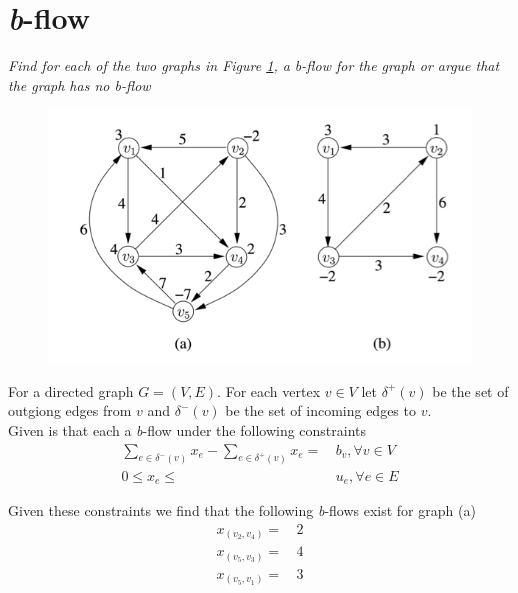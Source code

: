 \section{\textit{b}-flow}
\textit{Find for each of the two graphs in Figure \ref{fig:bflow}, a b-flow for the graph or argue that the graph has no b-flow}
\begin{figure}[h]
  \centering
  \includegraphics[scale=0.4]{images/bflow_graphs.png}
  \label{fig:bflow}
\end{figure}

For a directed graph \(G=(V,E)\). For each vertex \(v \in V\) let \(\delta^+(v)\) be the set of outgiong edges from \(v\) and \(\delta^-(v)\) be the set of incoming edges to \(v\).\\
Given is that each a \textit{b}-flow under the following constraints
\begin{align}
  \sum_{e\in \delta^-(v)} x_e - \sum_{e\in \delta^+(v)} x_e =&\, b_v, \forall v \in V\label{eqn:const1}\\
  0 \leq x_e \leq&\, u_e, \forall e \in E\label{eqn:const2}
\end{align}

\noindent Given these constraints we find that the following \textit{b}-flows exist for graph (a)
\begin{align*}
  x_{(v_2,v_4)} =&\, 2\\
  x_{(v_5,v_3)} =&\, 4\\
  x_{(v_5,v_1)} =&\, 3
\end{align*}

